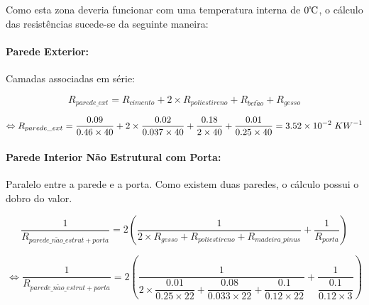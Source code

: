 \documentclass[12pt, a4paper]{article}
\begin{document}
Como esta zona deveria funcionar com uma temperatura interna de $0{\celsius}$, o c\'alculo das
resist\^encias sucede-se da seguinte maneira:

\paragraph{Parede Exterior:}\label{par:zona_d_ext}Camadas associadas em s\'erie:

\begin{equation}
    R_{parede\_ext} = R_{cimento} + 2 \times R_{poliestireno} + R_{bet\tilde{a}o} + R_{gesso}
    \label{eq:zona_d_ext_1}
\end{equation}

\begin{equation}
    \Leftrightarrow R_{parede\_ext} =
        \dfrac{0.09}{0.46 \times 40} +
        2 \times \dfrac{0.02}{0.037 \times 40} +
        \dfrac{0.18}{2 \times 40} +
        \dfrac{0.01}{0.25 \times 40} = 3.52 \times 10^{-2} \hspace{1mm} KW^{-1}
    \label{eq:zona_d_ext_2}
\end{equation}


\paragraph{Parede Interior N\~ao Estrutural com Porta:}\label{par:zona_d_int_n_est}Paralelo entre a parede e a porta. Como existem duas paredes, o c\'alculo possui o dobro do valor.

\begin{equation}
    \dfrac{1}{R_{parede\_n\tilde{a}o\_estrut + porta}} = 2 \left(
        \dfrac{1}{
            2 \times R_{gesso} + R_{poliestireno} + R_{madeira\_pinus}
        }
        +
        \dfrac{1}{
            R_{porta}
        }
    \right)
    \label{eq:zona_d_int_n_est_1}
\end{equation}

\begin{equation}
    \Leftrightarrow \dfrac{1}{R_{parede\_n\tilde{a}o\_estrut + porta}} = 2 \left(
        \dfrac{1}{
            2 \times \dfrac{0.01}{0.25 \times 22} +
            \dfrac{0.08}{0.033 \times 22} +
            \dfrac{0.1}{0.12 \times 22}
        }
        +
        \dfrac{1}{
            \dfrac{0.1}{0.12 \times 3}
        }
    \right)
    \label{eq:zona_d_int_n_est_2}
\end{equation}
\end{document}
